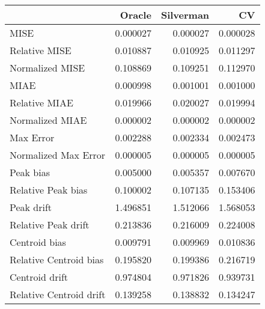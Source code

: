\begin{tabular}{lrrr}
  \hline
 & Oracle & Silverman & CV \\ 
  \hline
MISE & 0.000027 & 0.000027 & 0.000028 \\ 
  Relative MISE & 0.010887 & 0.010925 & 0.011297 \\ 
  Normalized MISE & 0.108869 & 0.109251 & 0.112970 \\ 
  MIAE & 0.000998 & 0.001001 & 0.001000 \\ 
  Relative MIAE & 0.019966 & 0.020027 & 0.019994 \\ 
  Normalized MIAE & 0.000002 & 0.000002 & 0.000002 \\ 
  Max Error & 0.002288 & 0.002334 & 0.002473 \\ 
  Normalized Max Error & 0.000005 & 0.000005 & 0.000005 \\ 
  Peak bias & 0.005000 & 0.005357 & 0.007670 \\ 
  Relative Peak bias & 0.100002 & 0.107135 & 0.153406 \\ 
  Peak drift & 1.496851 & 1.512066 & 1.568053 \\ 
  Relative Peak drift & 0.213836 & 0.216009 & 0.224008 \\ 
  Centroid bias & 0.009791 & 0.009969 & 0.010836 \\ 
  Relative Centroid bias & 0.195820 & 0.199386 & 0.216719 \\ 
  Centroid drift & 0.974804 & 0.971826 & 0.939731 \\ 
  Relative Centroid drift & 0.139258 & 0.138832 & 0.134247 \\ 
   \hline
\end{tabular}
